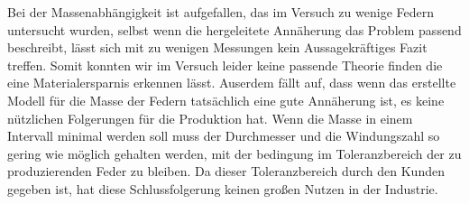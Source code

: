 Bei der Massenabhängigkeit ist aufgefallen, das im Versuch zu wenige Federn untersucht wurden, selbst wenn die hergeleitete Annäherung das Problem passend beschreibt, lässt sich mit zu wenigen Messungen kein Aussagekräftiges Fazit treffen.
Somit konnten wir im Versuch leider keine passende Theorie finden die eine Materialersparnis erkennen lässt.
Auserdem fällt auf, dass wenn das erstellte Modell für die Masse der Federn tatsächlich eine gute Annäherung ist, es keine nützlichen Folgerungen für die Produktion hat.
Wenn die Masse in einem Intervall minimal werden soll muss der Durchmesser und die Windungszahl so gering wie möglich gehalten werden, mit der bedingung im Toleranzbereich der zu produzierenden Feder zu bleiben.
Da dieser Toleranzbereich durch den Kunden gegeben ist, hat diese Schlussfolgerung keinen großen Nutzen in der Industrie.


